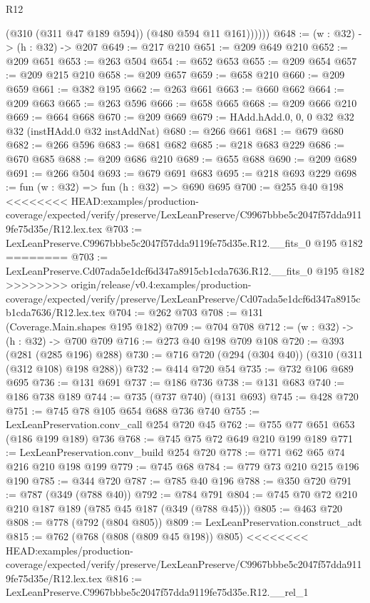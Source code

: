 \begin{lexlean}{R12}
\begin{coremodule}
{{{{{{{{              (@310 (@311 @47 @189 @594))
              (@480 @594 @11 @161))))))
@648 := (w : @32) -> (h : @32) -> @207
@649 := @217 @210
@651 := @209 @649 @210
@652 := @209 @651
@653 := @263 @504
@654 := @652 @653
@655 := @209 @654
@657 := @209 @215 @210
@658 := @209 @657
@659 := @658 @210
@660 := @209 @659
@661 := @382 @195
@662 := @263 @661
@663 := @660 @662
@664 := @209 @663
@665 := @263 @596
@666 := @658 @665
@668 := @209 @666 @210
@669 := @664 @668
@670 := @209 @669
@679 := HAdd.hAdd.{0, 0, 0} @32 @32 @32 (instHAdd.{0} @32 instAddNat)
@680 := @266 @661
@681 := @679 @680
@682 := @266 @596
@683 := @681 @682
@685 := @218 @683 @229
@686 := @670 @685
@688 := @209 @686 @210
@689 := @655 @688
@690 := @209 @689
@691 := @266 @504
@693 := @679 @691 @683
@695 := @218 @693 @229
@698 := fun (w : @32) => fun (h : @32) => @690 @695
@700 := @255 @40 @198
<<<<<<<< HEAD:examples/production-coverage/expected/verify/preserve/LexLeanPreserve/C9967bbbe5c2047f57dda9119fe75d35e/R12.lex.tex
@703 := LexLeanPreserve.C9967bbbe5c2047f57dda9119fe75d35e.R12.__fits_0 @195 @182
========
@703 := LexLeanPreserve.Cd07ada5e1dcf6d347a8915cb1cda7636.R12.__fits_0 @195 @182
>>>>>>>> origin/release/v0.4:examples/production-coverage/expected/verify/preserve/LexLeanPreserve/Cd07ada5e1dcf6d347a8915cb1cda7636/R12.lex.tex
@704 := @262 @703
@708 := @131 (Coverage.Main.shapes @195 @182)
@709 := @704 @708
@712 := (w : @32) -> (h : @32) -> @700 @709
@716 := @273 @40 @198 @709 @108
@720 := @393 (@281 (@285 @196) @288)
@730 := @716 @720 (@294 (@304 @40)) (@310 (@311 (@312 @108) @198 @288))
@732 := @414 @720 @54
@735 := @732 @106 @689 @695
@736 := @131 @691
@737 := @186 @736
@738 := @131 @683
@740 := @186 @738 @189
@744 := @735 (@737 @740) (@131 @693)
@745 := @428 @720
@751 := @745 @78 @105 @654 @688 @736 @740
@755 := LexLeanPreservation.conv_call @254 @720 @45
@762 := @755 @77 @651 @653 (@186 @199 @189) @736
@768 := @745 @75 @72 @649 @210 @199 @189
@771 := LexLeanPreservation.conv_build @254 @720
@778 := @771 @62 @65 @74 @216 @210 @198 @199
@779 := @745 @68
@784 := @779 @73 @210 @215 @196 @190
@785 := @344 @720
@787 := @785 @40 @196
@788 := @350 @720
@791 := @787 (@349 (@788 @40))
@792 := @784 @791
@804 := @745 @70 @72 @210 @210 @187 @189 (@785 @45 @187 (@349 (@788 @45)))
@805 := @463 @720
@808 := @778 (@792 (@804 @805))
@809 := LexLeanPreservation.construct_adt
@815 := @762 (@768 (@808 (@809 @45 @198)) @805)
<<<<<<<< HEAD:examples/production-coverage/expected/verify/preserve/LexLeanPreserve/C9967bbbe5c2047f57dda9119fe75d35e/R12.lex.tex
@816 := LexLeanPreserve.C9967bbbe5c2047f57dda9119fe75d35e.R12.__rel_1
}}}}}}}}
\end{coremodule}
\end{lexlean}
